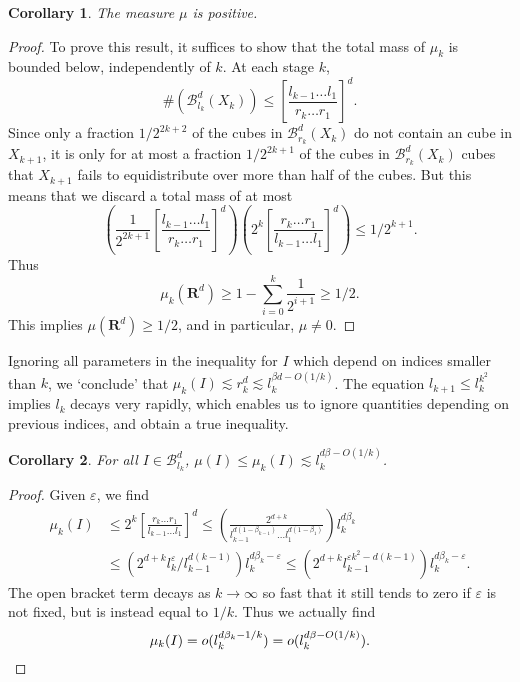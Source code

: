 \documentclass[usenames,dvipsnames]{article}
\theoremstyle{plain}
\newtheorem{corollary}{Corollary}
\theoremstyle{plain}
\begin{document}
\begin{corollary}
	The measure $\mu$ is positive.
\end{corollary}
\begin{proof}
	To prove this result, it suffices to show that the total mass of $\mu_k$ is bounded below, independently of $k$. At each stage $k$,
	\[ \# (\mathcal{B}^d_{l_k}(X_k)) \leq \left[ \frac{l_{k-1} \dots l_1}{r_k \dots r_1} \right]^d. \]
	Since only a fraction $1/2^{2k+2}$ of the cubes in $\mathcal{B}^d_{r_k}(X_k)$ do not contain an cube in $X_{k+1}$, it is only for at most a fraction $1/2^{2k+1}$ of the cubes in $\mathcal{B}^d_{r_k}(X_k)$ cubes that $X_{k+1}$ fails to equidistribute over more than half of the cubes. But this means that we discard a total mass of at most
	\[ \left( \frac{1}{2^{2k + 1}} \left[ \frac{l_{k-1} \dots l_1}{r_k \dots r_1} \right]^d \right) \left( 2^{k} \left[ \frac{r_k \dots r_1}{l_{k-1} \dots l_1} \right]^d \right) \leq 1/2^{k+1}. \]
	Thus
	\[ \mu_k(\mathbf{R}^d) \geq 1 - \sum_{i = 0}^k \frac{1}{2^{i+1}} \geq 1/2. \]
	This implies $\mu(\mathbf{R}^d) \geq 1/2$, and in particular, $\mu \neq 0$.
\end{proof}

Ignoring all parameters in the inequality for $I$ which depend on indices smaller than $k$, we `conclude' that $\mu_k(I) \lesssim r_k^d \lesssim l_k^{\beta d - O(1/k)}$. The equation $l_{k+1} \leq l_k^{k^2}$ implies $l_k$ decays very rapidly, which enables us to ignore quantities depending on previous indices, and obtain a true inequality.

\begin{corollary}
	For all $I \in \mathcal{B}^d_{l_k}$, $\mu(I) \leq \mu_k(I) \lesssim l_k^{d \beta - O(1/k)}$.
\end{corollary}
\begin{proof}
	Given $\varepsilon$, we find
	\begin{align*}
		\mu_k(I) &\leq 2^k \left[ \frac{r_k \dots r_1}{l_{k-1} \dots l_1} \right]^d \leq \left( \frac{2^{d + k}}{l_{k-1}^{d(1 - \beta_{k-1})} \dots l_1^{d(1 - \beta_1)}} \right) l_k^{d \beta_k}\\
		&\leq \left( 2^{d + k} l_k^\varepsilon / l_{k-1}^{d(k-1)} \right) l_k^{d \beta_k - \varepsilon} \leq \left( 2^{d + k} l_{k-1}^{\varepsilon k^2 - d(k - 1)} \right) l_k^{d \beta_k - \varepsilon}.
	\end{align*}
	The open bracket term decays as $k \to \infty$ so fast that it still tends to zero if $\varepsilon$ is not fixed, but is instead equal to $1/k$. Thus we actually find
	\[ \mu_k(I) = o(l_k^{d\beta_k - 1/k}) = o(l_k^{d\beta - O(1/k)}). \qedhere \]
\end{proof}
\end{document}
